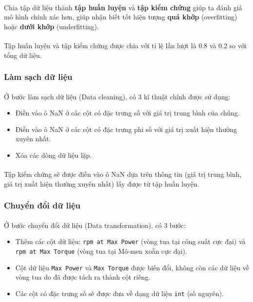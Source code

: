 \paragraph{}{Chia tập dữ liệu thành \textbf{tập huấn luyện} và \textbf{tập kiểm chứng} giúp ta đánh giá mô hình chính xác hơn, giúp nhận biết tốt hiện tượng \textbf{quá khớp} (overfitting) hoặc \textbf{dưới khớp} (underfitting).}

\paragraph{}{Tập huấn luyện và tập kiểm chứng được chia với tỉ lệ lần lượt là 0.8 và 0.2 so với tổng dữ liệu.}

\subsubsection{Làm sạch dữ liệu}
\paragraph{}{Ở bước làm sạch dữ liệu (Data cleaning), có 3 kĩ thuật chính được sử dụng:}

\begin{itemize}
    \item Điền vào ô NaN ở các cột có đặc trưng số với giá trị trung bình của chúng.
    \item Điền vào ô NaN ở các cột có đặc trưng phi số với giá trị xuất hiện thường xuyên nhất.
    \item Xóa các dòng dữ liệu lặp.
\end{itemize}

\paragraph{}{Tập kiểm chứng sẽ được điền vào ô NaN dựa trên thông tin (giá trị trung bình, giá trị xuất hiện thường xuyên nhất) lấy được từ tập huấn luyện.}

\subsubsection{Chuyển đổi dữ liệu}

\paragraph{}{Ở bước chuyển đổi dữ liệu (Data transformation), có 3 bước:}

\begin{itemize}
    \item Thêm các cột dữ liệu: \texttt{rpm at Max Power} (vòng tua tại công suất cực đại) và \texttt{rpm at Max Torque} (vòng tua tại Mô-men xoắn cực đại). 
    \item Cột dữ liệu \texttt{Max Power} và \texttt{Max Torque} được biến đổi, không còn các dữ liệu về vòng tua do đã được tách ra thành cột riêng.
    \item Các cột có đặc trưng số sẽ được đưa về dạng dữ liệu \texttt{int} (số nguyên).
\end{itemize}

